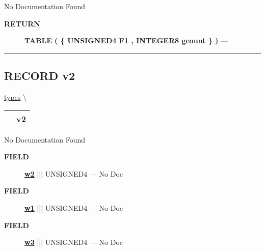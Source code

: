 \par





No Documentation Found








\par
\begin{description}
\item [\colorbox{tagtype}{\color{white} \textbf{\textsf{RETURN}}}] \textbf{TABLE ( \{ UNSIGNED4 F1 , INTEGER8 gcount \} )} --- 
\end{description}




\rule{\linewidth}{0.5pt}
\subsection*{\textsf{\colorbox{headtoc}{\color{white} RECORD}
v2}}

\hypertarget{ecldoc:types.v2}{}
\hspace{0pt} \hyperlink{ecldoc:types}{types} \textbackslash 

{\renewcommand{\arraystretch}{1.5}
\begin{tabularx}{\textwidth}{|>{\raggedright\arraybackslash}l|X|}
\hline
\hspace{0pt}\mytexttt{\color{red} } & \textbf{v2} \\
\hline
\end{tabularx}
}

\par





No Documentation Found







\par
\begin{description}
\item [\colorbox{tagtype}{\color{white} \textbf{\textsf{FIELD}}}] \textbf{\underline{w2}} ||| UNSIGNED4 --- No Doc
\item [\colorbox{tagtype}{\color{white} \textbf{\textsf{FIELD}}}] \textbf{\underline{w1}} ||| UNSIGNED4 --- No Doc
\item [\colorbox{tagtype}{\color{white} \textbf{\textsf{FIELD}}}] \textbf{\underline{w3}} ||| UNSIGNED4 --- No Doc
\end{description}





